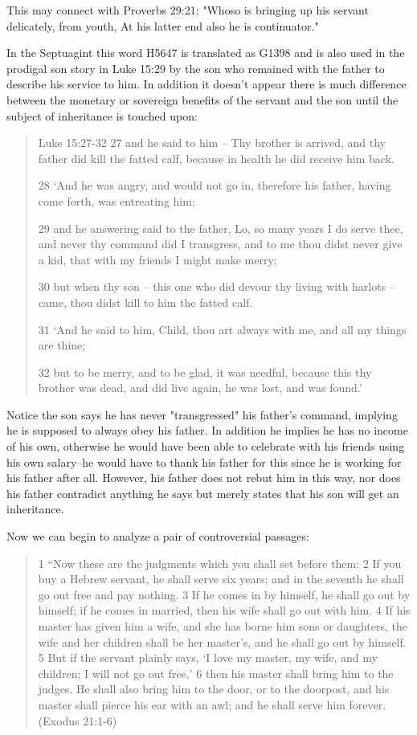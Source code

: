 \documentclass[11pt]{article}
\begin{document}
This may connect with Proverbs 29:21: "Whoso is bringing up his servant delicately, from youth, At his latter end also he is continuator." \newline

In the Septuagint this word H5647 is translated as G1398 and is also used in the prodigal son story in Luke 15:29 by the son who remained with the father to describe his service to him. In addition it doesn't appear there is much difference between the monetary or sovereign benefits of the servant and the son until the subject of inheritance is touched upon:

\begin{quote}
Luke 15:27-32
27 and he said to him -- Thy brother is arrived, and thy father did kill the fatted calf, because in health he did receive him back.

28 `And he was angry, and would not go in, therefore his father, having come forth, was entreating him;

29 and he answering said to the father, Lo, so many years I do serve thee, and never thy command did I transgress, and to me thou didst never give a kid, that with my friends I might make merry;

30 but when thy son -- this one who did devour thy living with harlots -- came, thou didst kill to him the fatted calf.

31 `And he said to him, Child, thou art always with me, and all my things are thine;

32 but to be merry, and to be glad, it was needful, because this thy brother was dead, and did live again, he was lost, and was found.' 
\end{quote}

Notice the son says he has never "transgressed" his father's command, implying he is supposed to always obey his father. In addition he implies he has no income of his own, otherwise he would have been able to celebrate with his friends using his own salary--he would have to thank his father for this since he is working for his father after all. However, his father does not rebut him in this way, nor does his father contradict anything he says but merely states that his son will get an inheritance.

Now we can begin to analyze a pair of controversial passages:

\begin{quote}
1 “Now these are the judgments which you shall set before them: 2 If you buy a Hebrew servant, he shall serve six years; and in the seventh he shall go out free and pay nothing. 3 If he comes in by himself, he shall go out by himself; if he comes in married, then his wife shall go out with him. 4 If his master has given him a wife, and she has borne him sons or daughters, the wife and her children shall be her master’s, and he shall go out by himself. 5 But if the servant plainly says, ‘I love my master, my wife, and my children; I will not go out free,’ 6 then his master shall bring him to the judges. He shall also bring him to the door, or to the doorpost, and his master shall pierce his ear with an awl; and he shall serve him forever. (Exodus 21:1-6)
\end{quote}
\end{document}
